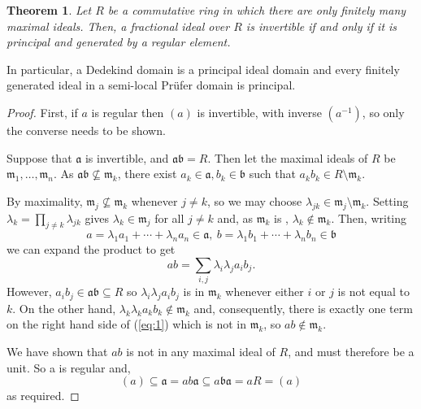 \documentclass[12pt]{article}
\newtheorem*{theorem*}{Theorem}
\begin{document}
\begin{theorem*}
Let $R$ be a commutative ring in which there are only finitely many maximal ideals. Then, a fractional ideal over $R$ is invertible if and only if it is principal and generated by a regular element.
\end{theorem*}

In particular, a   Dedekind domain is a principal ideal domain and every finitely generated ideal in a semi-local Pr\"ufer domain is principal.

\begin{proof}
First, if $a$ is regular then $(a)$ is invertible, with inverse $(a^{-1})$, so only the converse needs to be shown.

Suppose that $\mathfrak{a}$ is invertible, and $\mathfrak{a}\mathfrak{b}=R$.
Then let the maximal ideals of $R$ be $\mathfrak{m}_1,\ldots,\mathfrak{m}_n$. As $\mathfrak{a}\mathfrak{b}\not\subseteq\mathfrak{m}_k$, there exist $a_k\in\mathfrak{a},b_k\in\mathfrak{b}$ such that $a_kb_k\in R\setminus\mathfrak{m}_k$.

By maximality, $\mathfrak{m}_j\not\subseteq\mathfrak{m}_k$ whenever $j\not=k$, so we may choose $\lambda_{jk}\in\mathfrak{m}_j\setminus\mathfrak{m}_k$.
Setting $\lambda_k=\prod_{j\not=k}\lambda_{jk}$ gives $\lambda_k\in\mathfrak{m}_j$ for all $j\not=k$ and, as $\mathfrak{m}_k$ is , $\lambda_k\not\in\mathfrak{m}_k$.
Then, writing
\begin{equation*}
a = \lambda_1a_1+\cdots+\lambda_na_n\in\mathfrak{a},\ b=\lambda_1b_1+\cdots+\lambda_n b_n\in\mathfrak{b}
\end{equation*}
we can expand the product to get
\begin{equation}\label{eq:1}
ab = \sum_{i,j}\lambda_i\lambda_ja_ib_j.
\end{equation}
However, $a_ib_j\in\mathfrak{a}\mathfrak{b}\subseteq R$ so $\lambda_i\lambda_ja_ib_j$ is in $\mathfrak{m}_k$ whenever either $i$ or $j$ is not equal to $k$. On the other hand, $\lambda_k\lambda_ka_kb_k\not\in\mathfrak{m}_k$ and, consequently, there is exactly one term on the right hand side of (\ref{eq:1}) which is not in $\mathfrak{m}_k$, so $ab\not\in\mathfrak{m}_k$.

We have shown that $ab$ is not in any maximal ideal of $R$, and must therefore be a unit. So a is regular and,
\begin{equation*}
(a)\subseteq \mathfrak{a}=ab\mathfrak{a}\subseteq a\mathfrak{b}\mathfrak{a}=aR=(a)
\end{equation*}
as required.
\end{proof}

\end{document}
